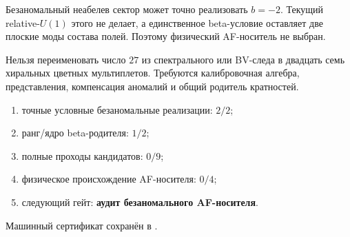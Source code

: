 \begin{theorem}
Безаномальный неабелев сектор может точно реализовать $b=-2$. Текущий
relative-$U(1)$ этого не делает, а единственное beta-условие оставляет две
плоские моды состава полей. Поэтому физический AF-носитель не выбран.
\end{theorem}

\begin{nogocriterion}
Нельзя переименовать число $27$ из спектрального или BV-следа в двадцать
семь хиральных цветных мультиплетов. Требуются калибровочная алгебра,
представления, компенсация аномалий и общий родитель кратностей.
\end{nogocriterion}

\begin{protocol}\begin{enumerate}
\item точные условные безаномальные реализации: \textbf{$2/2$};
\item ранг/ядро beta-родителя: \textbf{$1/2$};
\item полные проходы кандидатов: \textbf{$0/9$};
\item физическое происхождение AF-носителя: \textbf{$0/4$};
\item следующий гейт: \textbf{аудит безаномального AF-носителя}.
\end{enumerate}\end{protocol}

Машинный сертификат сохранён в
.